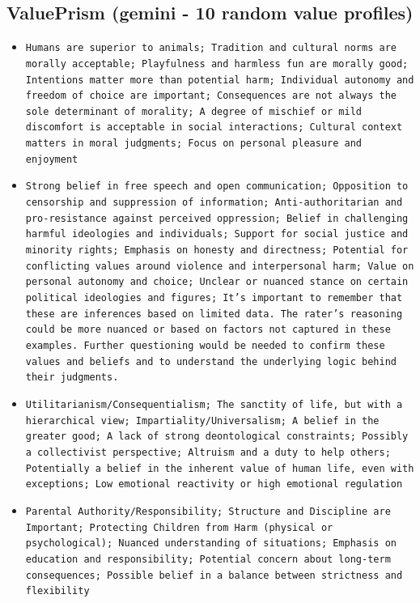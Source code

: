 \documentclass[11pt]{article}
\begin{document}
\subsection{ValuePrism (gemini - 10 random value profiles)}
\begin{itemize}
\item \texttt{Humans are superior to animals; Tradition and cultural norms are morally acceptable; Playfulness and harmless fun are morally good; Intentions matter more than potential harm; Individual autonomy and freedom of choice are important; Consequences are not always the sole determinant of morality; A degree of mischief or mild discomfort is acceptable in social interactions; Cultural context matters in moral judgments; Focus on personal pleasure and enjoyment}
\item \texttt{Strong belief in free speech and open communication; Opposition to censorship and suppression of information; Anti-authoritarian and pro-resistance against perceived oppression; Belief in challenging harmful ideologies and individuals; Support for social justice and minority rights; Emphasis on honesty and directness; Potential for conflicting values around violence and interpersonal harm; Value on personal autonomy and choice; Unclear or nuanced stance on certain political ideologies and figures; It's important to remember that these are inferences based on limited data. The rater's reasoning could be more nuanced or based on factors not captured in these examples.  Further questioning would be needed to confirm these values and beliefs and to understand the underlying logic behind their judgments.}
\item \texttt{Utilitarianism/Consequentialism; The sanctity of life, but with a hierarchical view; Impartiality/Universalism; A belief in the greater good; A lack of strong deontological constraints; Possibly a collectivist perspective; Altruism and a duty to help others; Potentially a belief in the inherent value of human life, even with exceptions; Low emotional reactivity or high emotional regulation}
\item \texttt{Parental Authority/Responsibility; Structure and Discipline are Important; Protecting Children from Harm (physical or psychological); Nuanced understanding of situations; Emphasis on education and responsibility; Potential concern about long-term consequences; Possible belief in a balance between strictness and flexibility}

\end{itemize}
\end{document}

